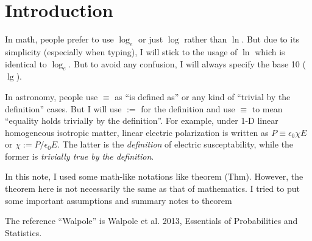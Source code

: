 \chapter*{Introduction}

In math, people prefer to use $ \log_e $ or just $ \log $ rather than $ \ln $. But due to its simplicity (especially when typing), I will stick to the usage of $ \ln $ which is identical to $ \log_e $. But to avoid any confusion, I will always specify the base 10 ($ \lg $).

In astronomy, people use $ \equiv $ as ``is defined as'' or any kind of ``trivial by the definition'' cases. But I will use $ := $ for the definition and use $ \equiv $ to mean ``equality holds trivially by the definition''. For example, under 1-D linear homogeneous isotropic matter, linear electric polarization is written as $ P \equiv \epsilon_0 \chi E $ or $ \chi := P/\epsilon_0 E $. The latter is the \textit{definition} of electric susceptability, while the former is \textit{trivially true by the definition}. 

In this note, I used some math-like notations like theorem (Thm). However, the theorem here is not necessarily the same as that of mathematics. I tried to put some important assumptions and summary notes to theorem

The reference ``Walpole'' is Walpole et al. 2013, Essentials of Probabilities and Statistics.